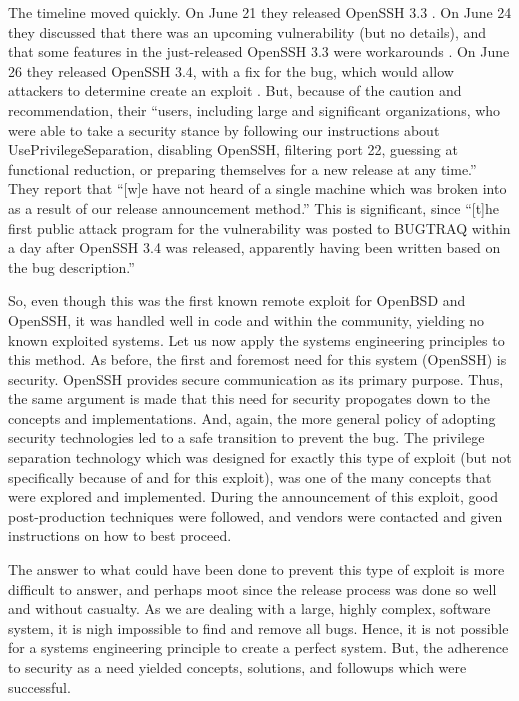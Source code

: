 \documentclass[12pt]{article}
\begin{document}
{The timeline moved quickly. On June 21 they released OpenSSH 3.3 \cite{openssh-33}. On June 24 they discussed that there was an upcoming vulnerability (but no details), and that some features in the just-released OpenSSH 3.3 were workarounds \cite{upcoming-vuln}. On June 26 they released OpenSSH 3.4, with a fix for the bug, which would allow attackers to determine create an exploit \cite{openssh-34}. But, because of the caution and recommendation, their ``users, including large and significant organizations, who were able to take a security stance by following our instructions about UsePrivilegeSeparation, disabling OpenSSH, filtering port 22, guessing at functional reduction, or preparing themselves for a new release at any time.'' They report that ``[w]e have not heard of a single machine which was broken into as a result of our release announcement method.'' This is significant, since ``[t]he first public attack program for the vulnerability was posted to BUGTRAQ within a day after OpenSSH 3.4 was released, apparently having been written based on the bug description.'' \cite{openssh-advisory}

So, even though this was the first known remote exploit for OpenBSD and OpenSSH, it was handled well in code and within the community, yielding no known exploited systems. Let us now apply the systems engineering principles to this method. As before, the first and foremost need for this system (OpenSSH) is security. OpenSSH provides secure communication as its primary purpose. Thus, the same argument is made that this need for security propogates down to the concepts and implementations. And, again, the more general policy of adopting security technologies led to a safe transition to prevent the bug. The privilege separation technology which was designed for exactly this type of exploit (but not specifically because of and for this exploit), was one of the many concepts that were explored and implemented. During the announcement of this exploit, good post-production techniques were followed, and vendors were contacted and given instructions on how to best proceed.

The answer to what could have been done to prevent this type of exploit is more difficult to answer, and perhaps moot since the release process was done so well and without casualty. As we are dealing with a large, highly complex, software system, it is nigh impossible to find and remove all bugs. Hence, it is not possible for a systems engineering principle to create a perfect system. But, the adherence to security as a need yielded concepts, solutions, and followups which were successful.

}
\end{document}

